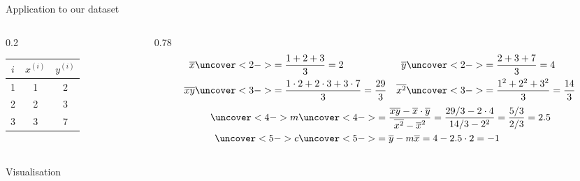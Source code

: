 \documentclass[aspectratio=169,t]{beamer}
\newcommand{\plotdata}{\addplot[data points] coordinates {(1,2) (2,3) (3,7)};}
\begin{document}
\begin{frame}{Application to our dataset}
  \begin{columns}[T,onlytextwidth]
    \begin{column}{0.2\textwidth}
      \centering
      \begin{tabular}{@{}ccc@{}}
        \toprule
        \(i\) & \(x^{(i)}\) & \(y^{(i)}\) \\
        \midrule
        1 & 1 & 2 \\
        2 & 2 & 3 \\
        3 & 3 & 7 \\
        \bottomrule
      \end{tabular}
    \end{column}
    \begin{column}{0.78\textwidth}
      \vspace{-1.2em}
      \begin{align*}
          \overline{x} &\uncover<2->{= \frac{1 + 2 + 3}{3} = 2} &
          \overline{y} &\uncover<2->{= \frac{2 + 3 + 7}{3} = 4}\\
          \overline{xy} &\uncover<3->{= \frac{1\cdot 2 + 2\cdot 3 + 3\cdot 7}{3} = \frac{29}{3}} &
          \overline{x^2} &\uncover<3->{= \frac{1^2 + 2^2 + 3^2}{3} = \frac{14}{3}}
      \end{align*}
      \begin{align*}
          \uncover<4->{m} &\uncover<4->{= \frac{\overline{xy} - \overline{x}\cdot \overline{y}}{\overline{x^2} - \overline{x}^2}
             = \frac{29/3 - 2\cdot 4}{14/3 - 2^2}
             = \frac{5/3}{2/3} = 2.5}\\
          \uncover<5->{c} &\uncover<5->{= \overline{y} - m\overline{x} = 4 - 2.5\cdot 2 = -1}
      \end{align*}
    \end{column}
  \end{columns}
\end{frame}
\begin{frame}{Visualisation}
  \begin{center}
  \end{center}
\end{frame}
\end{document}
